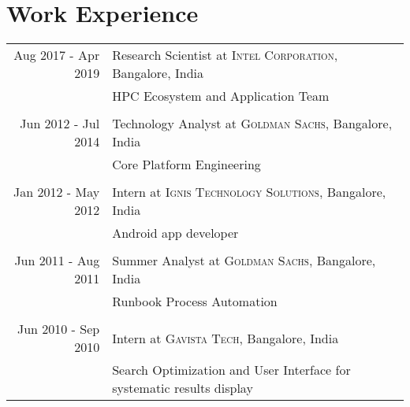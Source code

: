 \documentclass[a4paper,10pt]{article} %
\begin{document}

\section{Work Experience}

\begin{tabular}{r|p{10cm}}
Aug 2017 - Apr 2019 & Research Scientist at \textsc{Intel Corporation}, Bangalore, India \\
& \footnotesize{HPC Ecosystem and Application Team}\\
&\\

Jun 2012 - Jul 2014 & Technology Analyst at \textsc{Goldman Sachs}, Bangalore, India \\
& \footnotesize{Core Platform Engineering}\\ 
& \\

Jan 2012 - May 2012 & Intern at \textsc{Ignis Technology Solutions}, Bangalore, India \\
& \footnotesize{Android app developer}\\
& \\


Jun 2011 - Aug 2011 & Summer Analyst at \textsc{Goldman Sachs}, Bangalore, India \\
& \footnotesize{Runbook Process Automation}\\
& \\


Jun 2010 - Sep 2010 & Intern at \textsc{Gavista Tech}, Bangalore, India\\
& \footnotesize{Search Optimization and User Interface for systematic results display}\\

\end{tabular}


\end{document}
